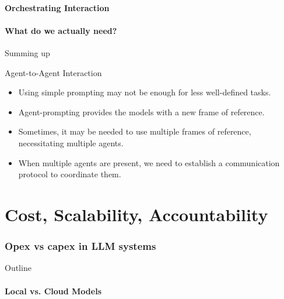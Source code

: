 \documentclass[24pt]{beamer}
\newcommand{\partslide}{
	\begin{frame}
		\partpage
	\end{frame}
}
\newcommand{\sectionslide}{
	\begin{frame}{Outline}
		\tableofcontents[currentsection]
\end{frame}
}
\newcommand{\subsectionslide}{
	 \begin{frame}
		\sectionpage
		\subsectionpage
	\end{frame}
}
\begin{document}
\subsection{Orchestrating Interaction}

\subsection{What do we actually need?}

\begin{frame}{Summing up}
	\begin{block}{Agent-to-Agent Interaction}
		\begin{itemize}
			\item Using simple prompting may not be enough for less well-defined tasks.
			\item Agent-prompting provides the models with a new frame of reference.
			\item Sometimes, it may be needed to use multiple frames of reference, necessitating multiple agents.
			\item When multiple agents are present, we need to establish a communication protocol to coordinate them.
		\end{itemize}
	\end{block}
\end{frame}


\part{Cost, Scalability, Accountability}
\partslide

\section{Opex vs capex in LLM systems}
\sectionslide


\subsection{Local vs. Cloud Models}
\subsectionslide
\end{document}

